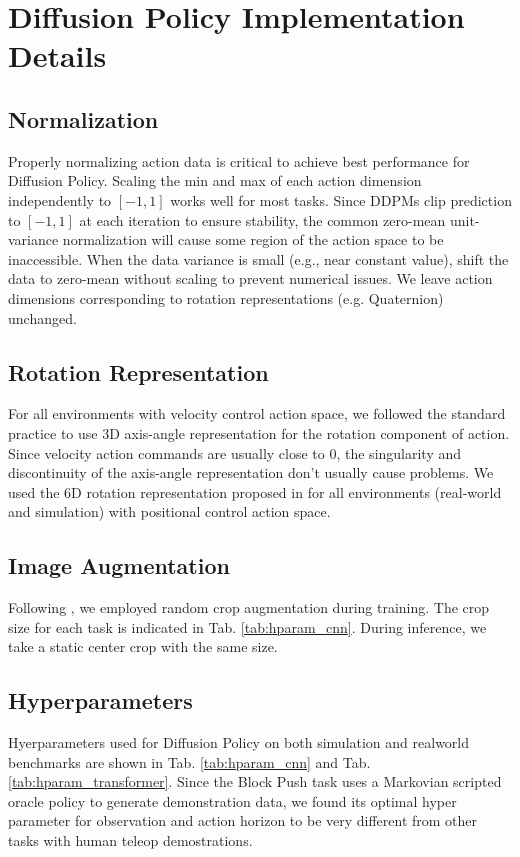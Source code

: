 \section{Diffusion Policy Implementation Details}

\subsection{Normalization}
Properly normalizing action data is critical to achieve best performance for Diffusion Policy. 
Scaling the min and max of each action dimension independently to $[-1,1]$ works well for most tasks. 
Since DDPMs clip prediction to $[-1,1]$ at each iteration to ensure stability, the common zero-mean unit-variance normalization will cause some region of the action space to be inaccessible. 
When the data variance is small (e.g., near constant value), shift the data to zero-mean without scaling to prevent numerical issues.
We leave action dimensions corresponding to rotation representations (e.g. Quaternion) unchanged.









\subsection{Rotation Representation}
For all environments with velocity control action space, we followed the standard practice \cite{robomimic} to use 3D axis-angle representation for the rotation component of action. Since velocity action commands are usually close to 0, the singularity and discontinuity of the axis-angle representation don't usually cause problems. We used the 6D rotation representation proposed in \citet{zhou2019continuity} for all environments (real-world and simulation) with positional control action space. 

\subsection{Image Augmentation}
Following \citet{robomimic}, we employed random crop augmentation during training. The crop size for each task is indicated in Tab. \ref{tab:hparam_cnn}. During inference, we take a static center crop with the same size.

\subsection{Hyperparameters}
Hyerparameters used for Diffusion Policy on both simulation and realworld benchmarks are shown in Tab. \ref{tab:hparam_cnn} and Tab. \ref{tab:hparam_transformer}. Since the Block Push task uses a Markovian scripted oracle policy to generate demonstration data, we found its optimal hyper parameter for observation and action horizon to be very different from other tasks with human teleop demostrations.

